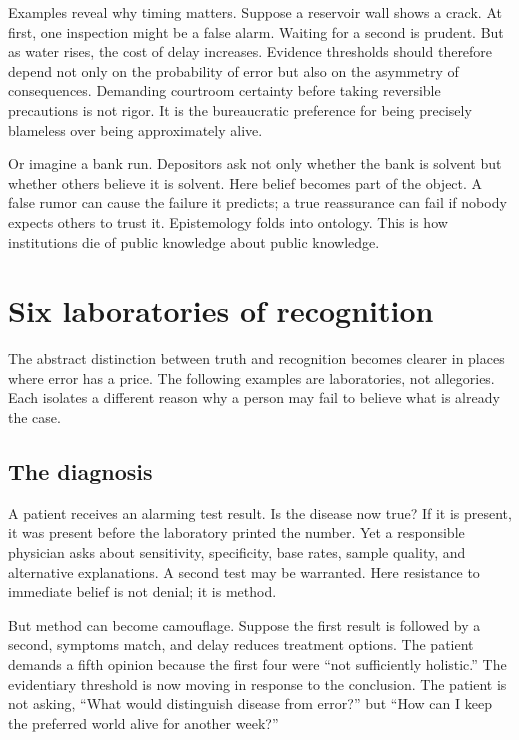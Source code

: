 ﻿\documentclass[12pt,a4paper]{book}
\begin{document}
Examples reveal why timing matters. Suppose a reservoir wall shows a crack. At first, one inspection might be a false alarm. Waiting for a second is prudent. But as water rises, the cost of delay increases. Evidence thresholds should therefore depend not only on the probability of error but also on the asymmetry of consequences. Demanding courtroom certainty before taking reversible precautions is not rigor. It is the bureaucratic preference for being precisely blameless over being approximately alive.

Or imagine a bank run. Depositors ask not only whether the bank is solvent but whether others believe it is solvent. Here belief becomes part of the object. A false rumor can cause the failure it predicts; a true reassurance can fail if nobody expects others to trust it. Epistemology folds into ontology. This is how institutions die of public knowledge about public knowledge.

\section{Six laboratories of recognition}

The abstract distinction between truth and recognition becomes clearer in places where error has a price. The following examples are laboratories, not allegories. Each isolates a different reason why a person may fail to believe what is already the case.

\subsection{The diagnosis}

A patient receives an alarming test result. Is the disease now true? If it is present, it was present before the laboratory printed the number. Yet a responsible physician asks about sensitivity, specificity, base rates, sample quality, and alternative explanations. A second test may be warranted. Here resistance to immediate belief is not denial; it is method.

But method can become camouflage. Suppose the first result is followed by a second, symptoms match, and delay reduces treatment options. The patient demands a fifth opinion because the first four were “not sufficiently holistic.” The evidentiary threshold is now moving in response to the conclusion. The patient is not asking, “What would distinguish disease from error?” but “How can I keep the preferred world alive for another week?”
\end{document}
